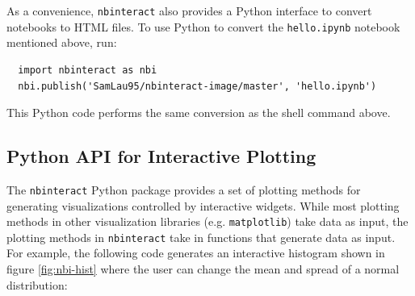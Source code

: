 \documentclass[nobib]{tufte-handout}
\newcommand{\code}[1]{\texttt{#1}}
\begin{document}
As a convenience, \code{nbinteract} also provides a Python interface to convert
notebooks to HTML files. To use Python to convert the \code{hello.ipynb}
notebook mentioned above, run:

\begin{verbatim}
  import nbinteract as nbi
  nbi.publish('SamLau95/nbinteract-image/master', 'hello.ipynb')
\end{verbatim}

This Python code performs the same conversion as the shell command above.


\subsection{Python API for Interactive Plotting} %
\label{sub:python_api_for_interactive_plotting}

The \code{nbinteract} Python package provides a set of plotting methods for
generating visualizations controlled by interactive widgets. While most
plotting methods in other visualization libraries (e.g. \code{matplotlib}) take
data as input, the plotting methods in \code{nbinteract} take in functions that
generate data as input. For example, the following code generates an
interactive histogram shown in figure \ref{fig:nbi-hist} where the user can
change the mean and spread of a normal distribution:

\newpage
\end{document}
